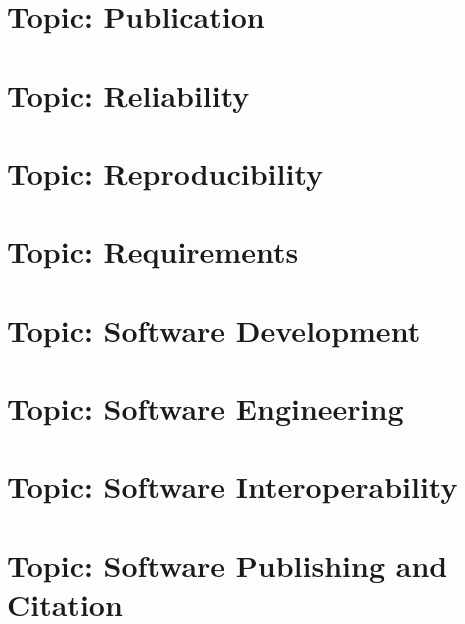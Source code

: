 \documentclass[twoside]{book}
\newcommand{\+}{\discretionary{\mbox{\scriptsize$\hookleftarrow$}}{}{}}
\begin{document}
\chapter{Topic\+: Publication}
\label{md_markdown_topic_publication}

\chapter{Topic\+: Reliability}
\label{md_markdown_topic_reliability}

\chapter{Topic\+: Reproducibility}
\label{md_markdown_topic_reproducibility}

\chapter{Topic\+: Requirements}
\label{md_markdown_topic_requirements}

\chapter{Topic\+: Software Development}
\label{md_markdown_topic_software_development}

\chapter{Topic\+: Software Engineering}
\label{md_markdown_topic_software_engineering}

\chapter{Topic\+: Software Interoperability}
\label{md_markdown_topic_software_interoperability}

\chapter{Topic\+: Software Publishing and Citation}
\label{md_markdown_topic_software_publishing_and_citation}

\end{document}

